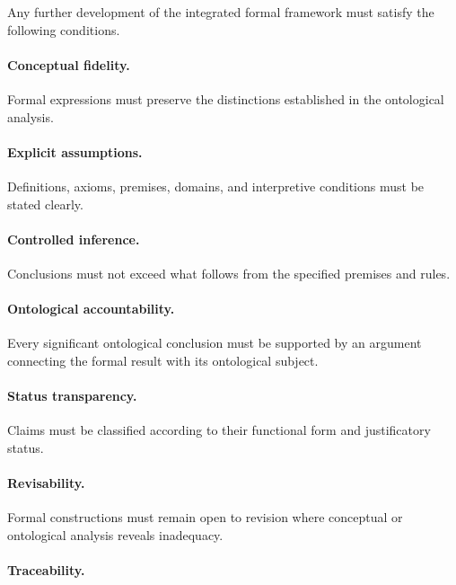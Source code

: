 Any further development
of the integrated
formal framework
must satisfy
the following conditions.

\paragraph{Conceptual fidelity.}

Formal expressions
must preserve
the distinctions
established in
the ontological
analysis.

\paragraph{Explicit assumptions.}

Definitions, axioms,
premises, domains,
and interpretive
conditions must
be stated
clearly.

\paragraph{Controlled inference.}

Conclusions must
not exceed
what follows
from the
specified premises
and rules.

\paragraph{Ontological accountability.}

Every significant
ontological conclusion
must be supported
by an argument
connecting the
formal result
with its
ontological subject.

\paragraph{Status transparency.}

Claims must
be classified
according to
their functional
form and
justificatory status.

\paragraph{Revisability.}

Formal constructions
must remain
open to
revision where
conceptual or
ontological analysis
reveals inadequacy.

\paragraph{Traceability.}

